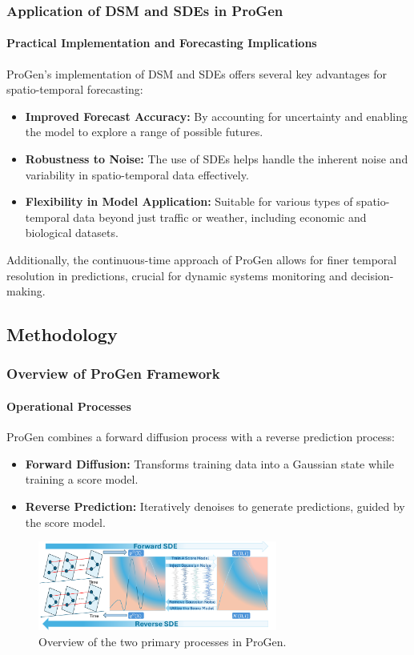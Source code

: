 \documentclass[light]{lutbeamer} %
\begin{document}
\begin{frame}
    \frametitle{Application of DSM and SDEs in ProGen}
    \framesubtitle{Practical Implementation and Forecasting Implications}

    ProGen's implementation of DSM and SDEs offers several key advantages for spatio-temporal forecasting:
    \begin{itemize}
        \item \textbf{Improved Forecast Accuracy:} By accounting for uncertainty and enabling the model to explore a range of possible futures.
        \item \textbf{Robustness to Noise:} The use of SDEs helps handle the inherent noise and variability in spatio-temporal data effectively.
        \item \textbf{Flexibility in Model Application:} Suitable for various types of spatio-temporal data beyond just traffic or weather, including economic and biological datasets.
    \end{itemize}
    Additionally, the continuous-time approach of ProGen allows for finer temporal resolution in predictions, crucial for dynamic systems monitoring and decision-making.
\end{frame}

\subsection{Methodology}
\begin{frame}
    \frametitle{Overview of ProGen Framework}
    \framesubtitle{Operational Processes}

    ProGen combines a forward diffusion process with a reverse prediction process:
    \begin{itemize}
        \item \textbf{Forward Diffusion:} Transforms training data into a Gaussian state while training a score model.
        \item \textbf{Reverse Prediction:} Iteratively denoises to generate predictions, guided by the score model.
    \end{itemize}

    \begin{figure}[ht]
        \centering
        \includegraphics[width=0.7\textwidth]{figures/ProGen_framework_new.pdf}
        \caption{Overview of the two primary processes in ProGen.}
        \label{fig:framework}
    \end{figure}

\end{frame}
\end{document}
